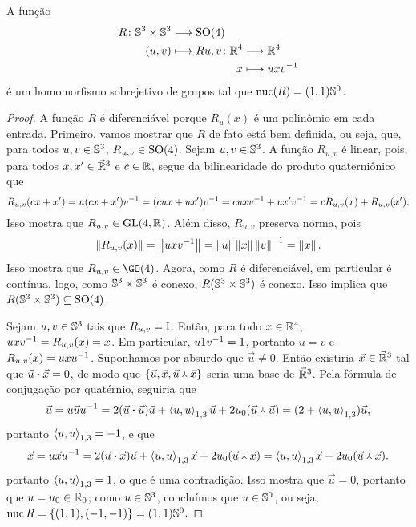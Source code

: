 \begin{definition}
A função
	\begin{align*}
	\func{R}{\S^3 \times \S^3}{\SO(4)}{(u,v)}{
		\begin{aligned}[t]
		\func{R{u,v}}{\R^4}{\R^4}{x}{uxv\inv}
		\end{aligned}
	}
	\end{align*}
é um homomorfismo sobrejetivo de grupos tal que $\nuc(R) = (1,1)\S^0$.
\end{definition}
\begin{proof}
A função $R$ é diferenciável porque $R_u(x)$ é um polinômio em cada entrada. Primeiro, vamos mostrar que $R$ de fato está bem definida, ou seja, que, para todos $u,v \in \S^3$, $R_{u,v} \in \SO(4)$. Sejam $u,v \in \S^3$. A função $R_{u,v}$ é linear, pois, para todos $x,x' \in \vec{\R}^3$ e $c \in \R$, segue da bilinearidade do produto quaterniônico que
	\begin{equation*}
	R_{u,v}(cx+x') = u(cx+x')v\inv = (cux+ux')v\inv = cuxv\inv + ux'v\inv = cR_{u,v}(x) + R_{u,v}(x').
	\end{equation*}
Isso mostra que $R_{u,v} \in \GL(4,\R)$. Além disso, $R_{u,v}$ preserva norma, pois
	\begin{equation*}
	\nor{R_{u,v}(x)} = \nor{uxv\inv} = \nor{u}\nor{x}\nor{v}\inv = \nor{x}.
	\end{equation*}
Isso mostra que $R_{u,v} \in \GO(4)$. Agora, como $R$ é diferenciável, em particular é contínua, logo, como $\S^3 \times \S^3$ é conexo, $R(\S^3 \times \S^3)$ é conexo. Isso implica que $R(\S^3 \times \S^3) \subseteq \SO(4)$.

Sejam $u,v \in \S^3$ tais que $R_{u,v} = \Id$. Então, para todo $x \in \R^4$, $uxv\inv = R_{u,v}(x) = x$. Em particular, $u1v\inv = 1$, portanto $u=v$ e $R_{u,v}(x) = uxu\inv$. Suponhamos por absurdo que $\vec{u} \neq 0$. Então existiria $\vec{x} \in \vec{\R}^3$ tal que $\pesc{\vec{u}}{\vec{x}} = 0$, de modo que $\{\vec{u},\vec{x},\pvec{\vec{u}}{\vec{x}}\}$ seria uma base de $\vec{\R}^3$. Pela fórmula de conjugação por quatérnio, seguiria que
	\begin{equation*}
	\vec{u} = u\vec{u}u\inv = 2(\pesc{\vec{u}}{\vec{u}})\vec{u} + \inteq{u}{u}\vec{u} + 2 \esc{u}(\pvec{\vec{u}}{\vec{u}}) = (2+\inteq{u}{u})\vec{u},
	\end{equation*}
portanto $\inteq{u}{u} = -1$, e que
	\begin{equation*}
	\vec{x} = u\vec{x}u\inv = 2(\pesc{\vec{u}}{\vec{x}})\vec{u} + \inteq{u}{u}\vec{x} + 2 \esc{u}(\pvec{\vec{u}}{\vec{x}}) = \inteq{u}{u}\vec{x} + 2\esc{u}(\pvec{\vec{u}}{\vec{x}}).
	\end{equation*}
portanto $\inteq{u}{u}=1$, o que é uma contradição. Isso mostra que $\vec{u} = 0$, portanto que $u = \esc{u} \in \esc{\R}$; como $u \in \S^3$, concluímos que $u \in \S^0$, ou seja, $\nuc{R} = \{(1,1),(-1,-1)\} = (1,1)\S^0$.


\end{proof}
